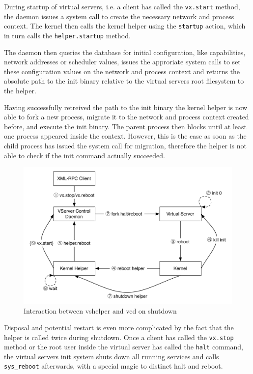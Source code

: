 During startup of virtual servers, i.e. a client has called the \verb,vx.start,
method, the daemon issues a system call to create the necessary network and
process context. The kernel then calls the kernel helper using the
\verb,startup, action, which in turn calls the \verb,helper.startup, method.

The daemon then queries the database for initial configuration, like
capabilities, network addresses or scheduler values, issues the approriate
system calls to set these configuration values on the network and process
context and returns the absolute path to the init binary relative to the
virtual servers root filesystem to the helper.

Having successfully retreived the path to the init binary the kernel helper is
now able to fork a new process, migrate it to the network and process context
created before, and execute the init binary. The parent process then blocks
until at least one process appeared inside the context. However, this is the
case as soon as the child process has issued the system call for migration,
therefore the helper is not able to check if the init command actually
succeeded.

\begin{figure}[hbt]
	\center
	\includegraphics[scale=0.6]{intro/vshelper-shutdown}
	\caption{Interaction between vshelper and vcd on shutdown}
	\label{fig:vshelper-shutdown}
\end{figure}

Disposal and potential restart is even more complicated by the fact that the
helper is called twice during shutdown. Once a client has called the
\verb,vx.stop, method or the root user inside the virtual server has called the
\verb,halt, command, the virtual servers init system shuts down all running
services and calls \verb,sys_reboot, afterwards, with a special magic to
distinct halt and reboot.

